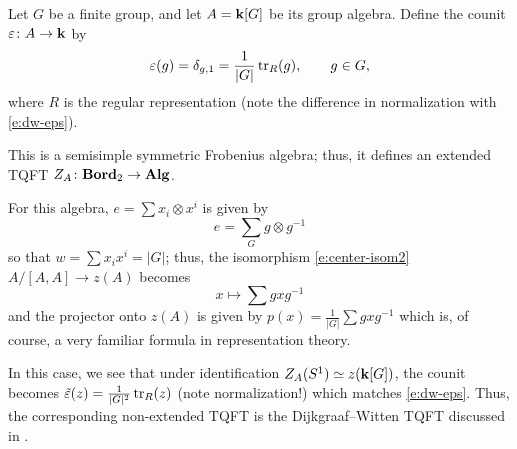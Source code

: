 \begin{example}\label{x:DW-extended}
  Let $G$ be a finite group, and let $A=\mathbf{k}[G]$ be its group algebra.
  Define the counit $\varepsilon\colon A\to \mathbf{k}$ by
  $$
  \varepsilon(g)=\delta_{g,1} = \frac{1}{|G|}\operatorname{tr}_R(g), \qquad g\in G,
  $$
  where $R$ is the regular representation (note the difference in normalization
  with \eqref{e:dw-eps}).

  This is a semisimple symmetric Frobenius algebra; thus, it defines an extended
  TQFT $Z_A\colon \mathbf{Bord}_2\to \mathbf{Alg}$.

  For this algebra, $e=\sum x_i\otimes x^i$ is given by
  $$
  e=\sum_G g\otimes g^{-1}
  $$
  so that $w=\sum x_ix^i=|G|$; thus, the isomorphism \eqref{e:center-isom2}
  $A/[A,A]\to z(A)$ becomes
  $$
    x\mapsto \sum gxg^{-1}
  $$
  and the projector onto $z(A)$ is given by $p(x)=\frac{1}{|G|} \sum gxg^{-1}$
  which is, of course, a very familiar formula in representation theory.

  In this case, we see that under identification $Z_A(S^1)\simeq
  z(\mathbf{k}[G])$, the counit becomes $\tilde {\varepsilon}(z)=\frac{1}{|G|^2}\operatorname{tr}_R(z)$
  (note normalization!) which matches \eqref{e:dw-eps}. Thus, the
  corresponding non-extended TQFT is the Dijkgraaf--Witten TQFT discussed in
  .
\end{example}







\clearpage
